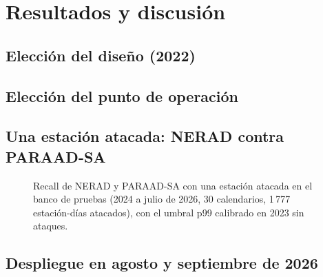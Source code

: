 \chapter{Resultados y discusión}
\label{cap:resultados}

\section{Elección del diseño (2022)}
\label{sec:res-escalera}

\section{Elección del punto de operación}
\label{sec:res-punto}

\section{Una estación atacada: NERAD contra PARAAD-SA}
\label{sec:res-una}
\begin{figure}[htbp]
  \centering
  
  \caption[Recall en el banco de pruebas con umbral p99]{Recall de NERAD y
  PARAAD-SA con una estación atacada en el banco de pruebas (2024 a julio de
  2026, 30 calendarios, 1\,777 estación-días atacados), con el umbral p99
  calibrado en 2023 sin ataques.}
  \label{fig:recall-banco-p99}
\end{figure}

\section{Despliegue en agosto y septiembre de 2026}
\label{sec:res-despliegue}

